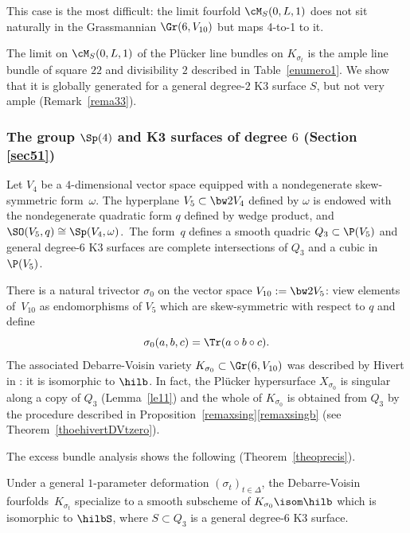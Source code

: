 This case is the most difficult: the limit fourfold $\cM_S(0,L,1)$ does not sit naturally in the Grassmannian $\Gr(6,V_{10})$ but maps 4-to-1 to it.

{The limit on $\cM_S(0,L,1)$ of the Plücker line bundles on $K_{\sigma_t}$ is the
ample line bundle of square $22$ and divisibility $2$
described in Table~\ref{enumero1}.
We show that it is globally generated for a general degree-$2$ K3 surface $S$, but not very ample (Remark~\ref{rema33}).}

\subsubsection{The group $\Sp(4)$ and K3 surfaces of degree $6$ (Section \ref{sec51})}\label{se112}
Let $V_4$ be a $4$\nobreakdash-dimensional vector space equipped with a nondegenerate skew-symmetric form~$\omega$. The hyperplane
$V_5\subset \bw2V_4 $ defined by $\omega$ is endowed with the nondegenerate quadratic form $q$ defined by wedge product, and
{$\SO(V_5,q)\cong \Sp(V_4,\omega)$.}\ The form~$q$ defines a smooth quadric $Q_3\subset \P(V_5)$ and general degree-$6$ K3 surfaces are complete intersections of $Q_3$ and a cubic in $\P(V_5) $.

There is a natural trivector $\sigma_0$ on
the vector space $V_{10}:=\bw2V_5$:
view
elements of~$V_{10}$ as endomorphisms of $V_5$ which are skew-symmetric with respect to $q$ and define
\begin{equation}\label{si0}
\sigma_0(a, b, c)=\Tr(a\circ b\circ c).
\end{equation}
The associated Debarre-Voisin variety $K_{\sigma_0}\subset \Gr (6, V_{10} ) $ was described by Hivert in \cite{hivert}: it is isomorphic to $\hilb$. In fact, the Plücker hypersurface $X_{\sigma_0}$ is singular along a copy of $Q_3$ (Lemma~\ref{le11}) and the whole of $K_{\sigma_0}$ is obtained from $Q_3$ by the procedure described in Proposition~\ref{remaxsing}\eqref{remaxsingb} (see Theorem~\ref{thoehivertDVtzero}).

The excess bundle analysis shows the following (Theorem~\ref{theoprecis}).

\begin{theo} \label{theohas}
Under a general $1$-parameter deformation
$(\sigma_t)_{t\in \Delta}$, the Debarre-Voisin fourfolds~$K_{\sigma_t}$ specialize to a smooth subscheme of $K_{\sigma_0}\isom \hilb$ which is isomorphic to
$\hilbS$, where $S\subset Q_3$ is a general degree-$6$ K3 surface.
\end{theo}

